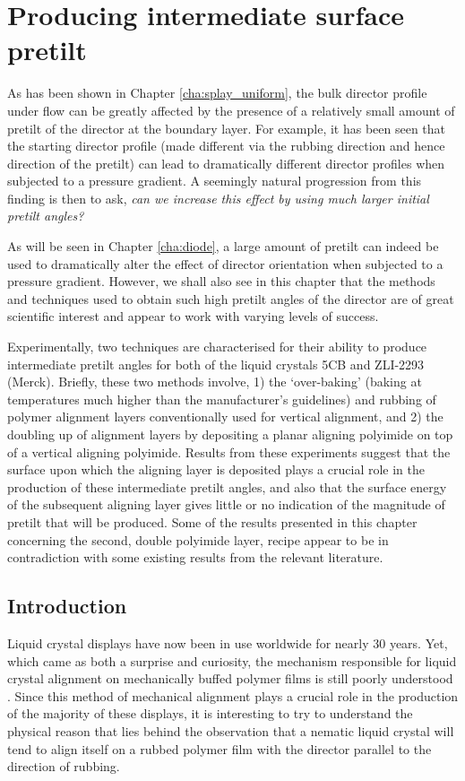 \chapter{Producing intermediate surface pretilt}
\label{cha:pretilt}
As has been shown in Chapter \ref{cha:splay_uniform}, the bulk director profile under flow can be greatly affected by the presence of a relatively small amount of pretilt of the director at the boundary layer. For example, it has been seen that the starting director profile (made different via the rubbing direction and hence direction of the pretilt) can lead to dramatically different director profiles when subjected to a pressure gradient. A seemingly natural progression from this finding is then to ask, \textit{can we increase this effect by using much larger initial pretilt angles?} 

As will be seen in Chapter \ref{cha:diode}, a large amount of pretilt can indeed be used to dramatically alter the effect of director orientation when subjected to a pressure gradient. However, we shall also see in this chapter that the methods and techniques used to obtain such high pretilt angles of the director are of great scientific interest and appear to work with varying levels of success.

Experimentally, two techniques are characterised for their ability to produce intermediate pretilt angles for both of the liquid crystals 5CB and ZLI-2293 (Merck). Briefly, these two methods involve, 1) the `over-baking' (baking at temperatures much higher than the manufacturer's guidelines) and rubbing of polymer alignment layers conventionally used for vertical alignment, and 2) the doubling up of alignment layers by depositing a planar aligning polyimide on top of a vertical aligning polyimide. Results from these experiments suggest that the surface upon which the aligning layer is deposited plays a crucial role in the production of these intermediate pretilt angles, and also that the surface energy of the subsequent aligning layer gives little or no indication of the magnitude of pretilt that will be produced. Some of the results presented in this chapter concerning the second, double polyimide layer, recipe appear to be in contradiction with some existing results from the relevant literature.

\section{Introduction}
\label{sec:pretilt_introduction}
Liquid crystal displays have now been in use worldwide for nearly 30 years. Yet, which came as both a surprise and curiosity, the mechanism responsible for liquid crystal alignment on mechanically buffed polymer films is still poorly understood \citep{Kumar2005}. Since this method of mechanical alignment plays a crucial role in the production of the majority of these displays, it is interesting to try to understand the physical reason that lies behind the observation that a nematic liquid crystal will tend to align itself on a rubbed polymer film with the director parallel to the direction of rubbing.

